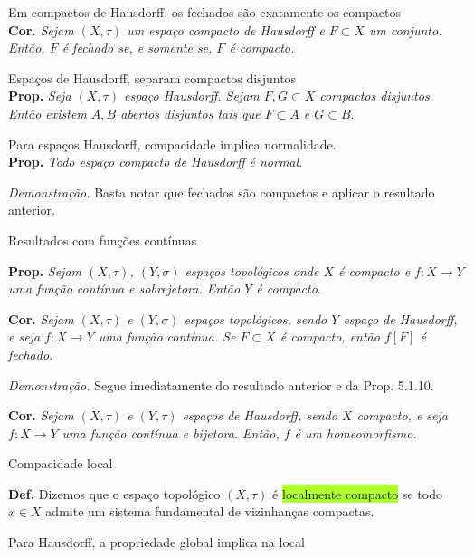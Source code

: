 \documentclass{article}
\begin{document}
\begin{landscape}
\begin{multicols}{3}
\color{blue!70}Em compactos de Hausdorff, os fechados são exatamente os compactos\\
\color{black}
\textbf{Cor.}\textit{ Sejam \((X, \tau)\) um espaço compacto de Hausdorff e \(F \subset X\) um conjunto. Então, \(F\) é fechado se, e somente se, \(F\) é compacto.}\medskip

\color{blue!70}Espaços de Hausdorff, separam compactos disjuntos \\
\color{black}
\textbf{Prop.} \textit{Seja \((X, \tau)\) espaço Hausdorff. Sejam \(F, G \subset X\) compactos disjuntos. Então existem \(A, B\) abertos disjuntos tais que \(F \subset A\) e \(G \subset B\)}.

\vspace{1em}

\color{blue!70} Para espaços Hausdorff, compacidade implica normalidade.\color{black}\\
\textbf{Prop.}\textit{ Todo espaço compacto de Hausdorff é normal.}

\textit{Demonstração.} Basta notar que fechados são compactos e aplicar o resultado anterior.  

\vspace{1em}
\colorbox{cinza}{Resultados com funções contínuas}\medskip

\textbf{Prop.} \textit{Sejam \((X, \tau)\), \((Y, \sigma)\) espaços topológicos onde \(X\) é compacto e \(f : X \to Y\) uma função contínua e sobrejetora. Então \(Y\) é compacto.}

\vspace{1em}

\textbf{Cor.} \textit{Sejam \((X, \tau)\) e \((Y, \sigma)\) espaços topológicos, sendo \(Y\) espaço de Hausdorff, e seja \(f : X \to Y\) uma função contínua. Se \(F \subset X\) é compacto, então \(f[F]\) é fechado.}

\textit{Demonstração.} Segue imediatamente do resultado anterior e da Prop. 5.1.10.  \medskip

\textbf{Cor.}\textit{ Sejam \((X, \tau)\) e \((Y, \tau)\) espaços de Hausdorff, sendo \(X\) compacto, e seja \(f : X \to Y\) uma função contínua e bijetora. Então, \(f\) é um homeomorfismo.}\medskip


\colorbox{cinza}{Compacidade local}\medskip

\textbf{Def.} Dizemos que o espaço topológico $(X, \tau)$ é \colorbox{GreenYellow}{localmente compacto} se todo $x \in X$ admite um sistema fundamental de vizinhanças compactas. \medskip

\color{blue!70}Para Hausdorff, a propriedade global implica na local\color{black}


\end{multicols}
\end{landscape}
\end{document}
